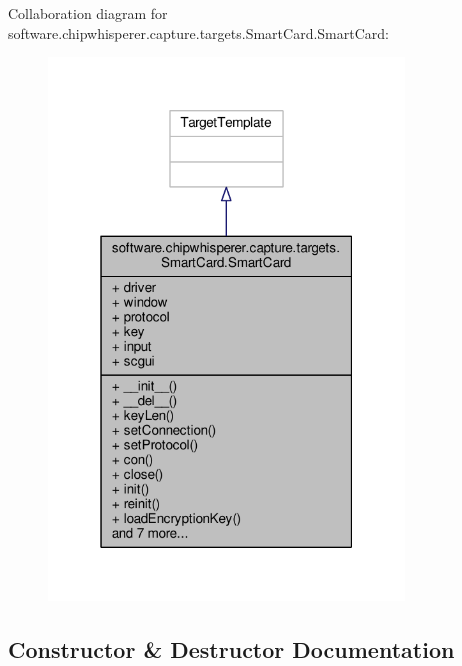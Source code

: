 Collaboration diagram for software.\+chipwhisperer.\+capture.\+targets.\+Smart\+Card.\+Smart\+Card\+:\nopagebreak
\begin{figure}[H]
\begin{center}
\leavevmode
\includegraphics[width=268pt]{dd/d48/classsoftware_1_1chipwhisperer_1_1capture_1_1targets_1_1SmartCard_1_1SmartCard__coll__graph}
\end{center}
\end{figure}


\subsection{Constructor \& Destructor Documentation}
\hypertarget{classsoftware_1_1chipwhisperer_1_1capture_1_1targets_1_1SmartCard_1_1SmartCard_a1078f73e3fffdca9adb3069fb364a9e9}{}
